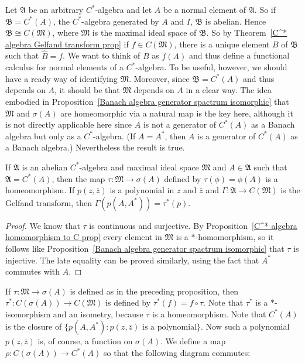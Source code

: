 Let $\mathfrak{A}$ be an arbitrary $C^*$-algebra and let $A$ be a normal element of $\mathfrak{A}$. So if $\mathfrak{B}=C^*(A)$, the $C^*$-algebra generated by $A$ and $I$, $\mathfrak{B}$ is abelian. Hence $\mathfrak{B}\cong C(\mathfrak{M})$, where $\mathfrak{M}$ is the maximal ideal space of $\mathfrak{B}$. So by Theorem~\ref{C^* algebra Gelfand transform prop} if $f\in C(\mathfrak{M})$, there is a unique element $B$ of $\mathfrak{B}$ such that $\hat{B}=f$. We want to think of $B$ as $f(A)$ and thus define a functional calculus for normal elements of a $C^*$-algebra. To be useful, however, we should have a ready way of identifying $\mathfrak{M}$. Moreover, since $\mathfrak{B}=C^*(A)$ and thus depends on $A$, it should be that $\mathfrak{M}$ depends on $A$ in a clear way. The idea embodied in Proposition~\ref{Banach algebra generator spactrum isomorphic} that $\mathfrak{M}$ and $\sigma(A)$ are homeomorphic via a natural map is the key here, although it is not directly applicable here since $A$ is not a generator of $C^*(A)$ as a Banach algebra but only as a $C^*$-algebra. (If $A=A^*$, then $A$ is a generator of $C^*(A)$ as a Banach algebra.) Nevertheless the result is true.
\begin{proposition}\label{C^* algebra generator spectrum isomorphic}
If $\mathfrak{A}$ is an abelian $C^*$-algebra and maximal ideal space $\mathfrak{M}$ and $A\in\mathfrak{A}$ such that $\mathfrak{A}=C^*(A)$, then the map $\tau:\mathfrak{M}\to\sigma(A)$ defined by $\tau(\phi)=\phi(A)$ is a homeomorphism. If $p(z,\bar{z})$ is a polynomial in $z$ and $\bar{z}$ and $\Gamma:\mathfrak{A}\to C(\mathfrak{M})$ is the Gelfand transform, then $\Gamma(p(A,A^*))=\tau^*(p)$.
\end{proposition}
\begin{proof}
We know that $\tau$ is continuous and surjective. By Proposition~\ref{C^* algebra homomorphism to C prop} every element in $\mathfrak{M}$ is a $*$-homomorphism, so it follows like Proposition~\ref{Banach algebra generator spactrum isomorphic} that $\tau$ is injective. The late equality can be proved similarly, using the fact that $A^*$ commutes with $A$.
\end{proof}
If $\tau:\mathfrak{M}\to\sigma(A)$ is defined as in the preceding proposition, then $\tau^*:C(\sigma(A))\to C(\mathfrak{M})$ is defined by $\tau^*(f)=f\circ \tau$. Note that $\tau^*$ is a $*$-isomorphism and an isometry, because $\tau$ is a homeomorphism. Note that $C^*(A)$ is the closure of $\{p(A,A^*):p(z,\bar{z})\text{ is a polynomial}\}$. Now such a polynomial $p(z,\bar{z})$ is, of course, a function on $\sigma(A)$. We define a map $\rho:C(\sigma(A))\to C^*(A)$ so that the following diagram commutes:
